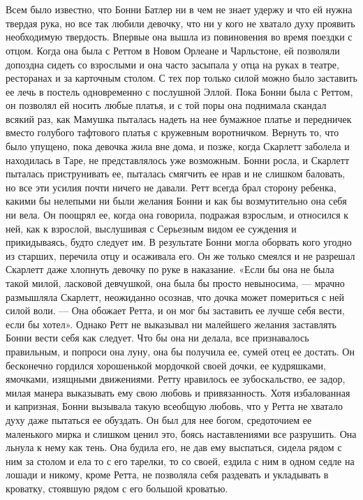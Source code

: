 \chapter{\ }

Всем было известно, что Бонни Батлер ни в чем не знает удержу и что ей нужна твердая рука, но все так любили девочку, что ни у кого не хватало духу проявить необходимую твердость. Впервые она вышла из повиновения во время поездки с отцом. Когда она была с Реттом в Новом Орлеане и Чарльстоне, ей позволяли допоздна сидеть со взрослыми и она часто засыпала у отца на руках в театре, ресторанах и за карточным столом. С тех пор только силой можно было заставить ее лечь в постель одновременно с послушной Эллой. Пока Бонни была с Реттом, он позволял ей носить любые платья, и с той поры она поднимала скандал всякий раз, как Мамушка пыталась надеть на нее бумажное платье и передничек вместо голубого тафтового платья с кружевным воротничком.
Вернуть то, что было упущено, пока девочка жила вне дома, и позже, когда Скарлетт заболела и находилась в Таре, не представлялось уже возможным. Бонни росла, и Скарлетт пыталась приструнивать ее, пыталась смягчить ее нрав и не слишком баловать, но все эти усилия почти ничего не давали. Ретт всегда брал сторону ребенка, какими бы нелепыми ни были желания Бонни и как бы возмутительно она себя ни вела. Он поощрял ее, когда она говорила, подражая взрослым, и относился к ней, как к взрослой, выслушивая с Серьезным видом ее суждения и прикидываясь, будто следует им. В результате Бонни могла оборвать кого угодно из старших, перечила отцу и осаживала его. Он же только смеялся и не разрешал Скарлетт даже хлопнуть девочку по руке в наказание.
«Если бы она не была такой милой, ласковой девчушкой, она была бы просто невыносима, — мрачно размышляла Скарлетт, неожиданно осознав, что дочка может помериться с ней силой воли. — Она обожает Ретта, и он мог бы заставить ее лучше себя вести, если бы хотел».
Однако Ретт не выказывал ни малейшего желания заставлять Бонни вести себя как следует. Что бы она ни делала, все признавалось правильным, и попроси она луну, она бы получила ее, сумей отец ее достать. Он бесконечно гордился хорошенькой мордочкой своей дочки, ее кудряшками, ямочками, изящными движениями. Ретту нравилось ее зубоскальство, ее задор, милая манера выказывать ему свою любовь и привязанность. Хотя избалованная и капризная, Бонни вызывала такую всеобщую любовь, что у Ретта не хватало духу даже пытаться ее обуздать. Он был для нее богом, средоточием ее маленького мирка и слишком ценил это, боясь наставлениями все разрушить.
Она льнула к нему как тень. Она будила его, не дав ему выспаться, сидела рядом с ним за столом и ела то с его тарелки, то со своей, ездила с ним в одном седле на лошади и никому, кроме Ретта, не позволяла себя раздевать и укладывать в кроватку, стоявшую рядом с его большой кроватью.
